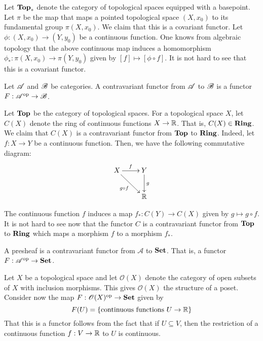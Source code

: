 Let $\mathbf{Top}_*$ denote the category of topological spaces equipped with a basepoint. Let $\pi$ be the map that maps a pointed topological space $(X,x_0)$ to its fundamental group $\pi(X,x_0)$. We claim that this is a covariant functor. Let $\phi: (X,x_0)\to(Y,y_0)$ be a continuous function. One knows from algebraic topology that the above continuous map induces a homomorphism $\phi_*:\pi(X,x_0)\to\pi(Y,y_0)$ given by $[f]\mapsto[\phi\circ f]$. It is not hard to see that this is a covariant functor.

\begin{definition}
    Let $\mathscr{A}$ and $\mathscr{B}$ be categories. A contravariant functor from $\mathscr{A}$ to $\mathscr{B}$ is a functor $F:\mathscr{A}^{\text{op}}\to\mathscr{B}$.
\end{definition}

Let $\mathbf{Top}$ be the category of topological spaces. For a topological space $X$, let $C(X)$ denote the ring of continuous functions $X\to\mathbb{R}$. That is, $C(X)\in\mathbf{Ring}$. We claim that $C(X)$ is a contravariant functor from $\mathbf{Top}$ to $\mathbf{Ring}$. Indeed, let $f: X\to Y$ be a continuous function. Then, we have the following commutative diagram: 
\begin{equation*}
\xymatrix {
    X\ar[r]^f\ar[rd]_{g\circ f} & Y\ar[d]^g\\
    & \R
}
\end{equation*}

The continuous function $f$ induces a map $f_*: C(Y)\to C(X)$ given by $g\mapsto g\circ f$. It is not hard to see now that the functor $C$ is a contravariant functor from $\mathbf{Top}$ to $\mathbf{Ring}$ which maps a morphism $f$ to a morphism $f_*$.


\begin{definition}[Presheaf]
    A presheaf is a contravariant functor from $\mathscr A$ to $\mathbf{Set}$. That is, a functor $F:\mathscr{A}^{\text{op}}\to\mathbf{Set}$.
\end{definition}

Let $X$ be a topological space and let $\mathscr O(X)$ denote the category of open subsets of $X$ with inclusion morphisms. This gives $\mathscr O(X)$ the structure of a poset. Consider now the map $F:\mathscr O(X)^{\text{op}}\to\mathbf{Set}$ given by 
\begin{equation*}
    F(U) = \left\{\text{continuous functions }U\to\mathbb{R}\right\}
\end{equation*}
That this is a functor follows from the fact that if $U\subseteq V$, then the restriction of a continuous function $f: V\to\mathbb{R}$ to $U$ is continuous.

